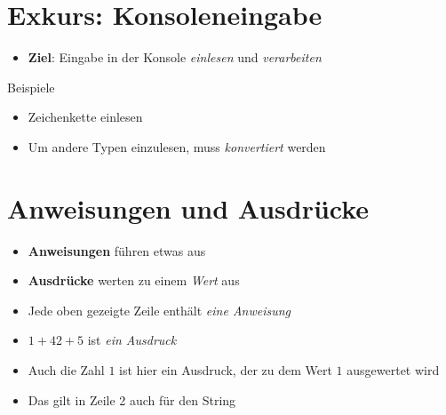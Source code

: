 \livecoding

\section{Exkurs: Konsoleneingabe}
\begin{frame}
	\slidehead

	\begin{itemize}
		\item \textbf{Ziel}: Eingabe in der Konsole \textit{einlesen} und \textit{verarbeiten}
	\end{itemize}

	\begin{block}{Beispiele}
		\begin{itemize}
			\item Zeichenkette einlesen
			\item Um andere Typen einzulesen, muss \textit{konvertiert} werden
		\end{itemize}
	\end{block}
\end{frame}

\livecoding

\subtitle{Anweisungen und Ausdrücke}
\maketitle


\section{Anweisungen und Ausdrücke}
\begin{frame}
	\slidehead
	\begin{itemize}
		\item \textbf{Anweisungen} führen etwas aus
		\item \textbf{Ausdrücke} werten zu einem \textit{Wert} aus
	\end{itemize}
	\pause
	\begin{itemize}
		\item Jede oben gezeigte Zeile enthält \textit{eine Anweisung}
		\item $1 + 42 + 5$ ist \textit{ein Ausdruck}
		\pause
		\item Auch die Zahl $1$ ist hier ein Ausdruck, der zu dem Wert $1$ ausgewertet wird
		\item Das gilt in Zeile 2 auch für den String
	\end{itemize}

\end{frame}




